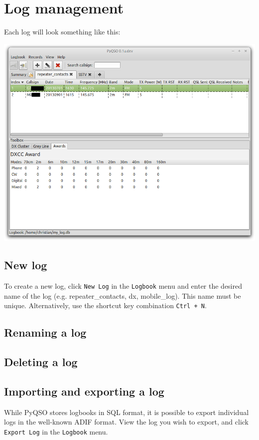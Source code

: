 \documentclass[11pt, a4paper]{report}
\begin{document}
\chapter{Log management}
Each log will look something like this:
\begin{center}
  \includegraphics[width=1\columnwidth]{images/log_with_awards.png}
\end{center}

\section{New log}
To create a new log, click \texttt{New Log} in the \texttt{Logbook} menu and enter the desired name of the log (e.g. repeater\_contacts, dx, mobile\_log). This name must be unique. Alternatively, use the shortcut key combination \texttt{Ctrl + N}.

\section{Renaming a log}
\section{Deleting a log}

\section{Importing and exporting a log}
While PyQSO stores logbooks in SQL format, it is possible to export individual logs in the well-known ADIF format. View the log you wish to export, and click \texttt{Export Log} in the \texttt{Logbook} menu.
\end{document}
